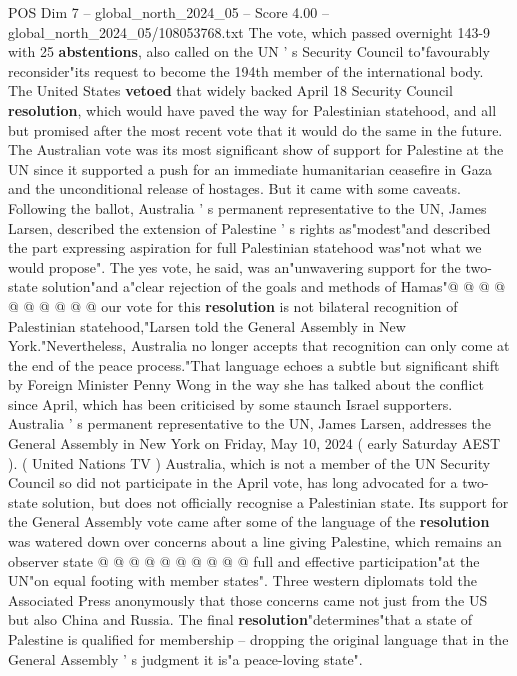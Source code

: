 \begin{textsample}{POS Dim 7 – global\_north\_2024\_05 – Score 4.00 – global\_north\_2024\_05/108053768.txt}  \label{ex:f7_pos_260}
The vote, which passed overnight 143-9 with 25 \textbf{abstentions}, also called on the UN ' s Security Council to"favourably reconsider"its request to become the 194th member of the international body.
The United States \textbf{vetoed} that widely backed April 18 Security Council \textbf{resolution}, which would have paved the way for Palestinian statehood, and all but promised after the most recent vote that it would do the same in the future.
The Australian vote was its most significant show of support for Palestine at the UN since it supported a push for an immediate humanitarian ceasefire in Gaza and the unconditional release of hostages.
But it came with some caveats.
Following the ballot, Australia ' s permanent representative to the UN, James Larsen, described the extension of Palestine ' s rights as"modest"and described the part expressing aspiration for full Palestinian statehood was"not what we would propose".
The yes vote, he said, was an"unwavering support for the two-state solution"and a"clear rejection of the goals and methods of Hamas"@ @ @ @ @ @ @ @ @ @ our vote for this \textbf{resolution} is not bilateral recognition of Palestinian statehood,"Larsen told the General Assembly in New York."Nevertheless, Australia no longer accepts that recognition can only come at the end of the peace process."That language echoes a subtle but significant shift by Foreign Minister Penny Wong in the way she has talked about the conflict since April, which has been criticised by some staunch Israel supporters.
Australia ' s permanent representative to the UN, James Larsen, addresses the General Assembly in New York on Friday, May 10, 2024 ( early Saturday AEST ). ( United Nations TV ) Australia, which is not a member of the UN Security Council so did not participate in the April vote, has long advocated for a two-state solution, but does not officially recognise a Palestinian state.
Its support for the General Assembly vote came after some of the language of the \textbf{resolution} was watered down over concerns about a line giving Palestine, which remains an observer state @ @ @ @ @ @ @ @ @ @ full and effective participation"at the UN"on equal footing with member states".
Three western diplomats told the Associated Press anonymously that those concerns came not just from the US but also China and Russia.
The final \textbf{resolution}"determines"that a state of Palestine is qualified for membership -- dropping the original language that in the General Assembly ' s judgment it is"a peace-loving state".

\end{textsample}
